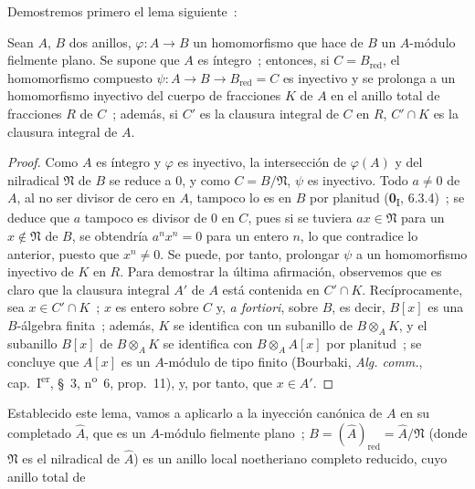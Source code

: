 Demostremos primero el lema siguiente~:

\begin{lemma}[23.2.7.1]
\label{0.23.2.7.1-fr}
Sean $A$, $B$ dos anillos, $\varphi:A\to B$ un homomorfismo que hace de $B$
un $A$-módulo fielmente plano. Se supone que $A$ es íntegro~; entonces, si
$C=B_{\mathrm{red}}$, el homomorfismo compuesto
$\psi:A\to B\to B_{\mathrm{red}}=C$ es inyectivo y se prolonga a un
homomorfismo inyectivo del cuerpo de fracciones $K$ de $A$ en el anillo total
de fracciones $R$ de $C$~; además, si $C'$ es la clausura integral de
$C$ en $R$, $C'\cap K$ es la clausura integral de $A$.
\end{lemma}

\begin{proof}
Como $A$ es íntegro y $\varphi$ es inyectivo, la intersección de $\varphi(A)$
y del nilradical $\mathfrak N$ de $B$ se reduce a $0$, y como
$C=B/\mathfrak N$, $\psi$ es inyectivo. Todo $a\neq0$ de $A$, al no ser
divisor de cero en $A$, tampoco lo es en $B$ por planitud
(\textbf{0}\textsubscript{I}, 6.3.4)~; se deduce que $a$ tampoco es divisor
de $0$ en $C$, pues si se tuviera $ax\in\mathfrak N$ para un
$x\notin\mathfrak N$ de $B$, se obtendría $a^nx^n=0$ para un entero $n$,
lo que contradice lo anterior, puesto que $x^n\neq0$. Se puede, por tanto, prolongar
$\psi$ a un homomorfismo inyectivo de $K$ en $R$. Para demostrar la última
afirmación, observemos que es claro que la clausura integral $A'$ de $A$ está
contenida en $C'\cap K$. Recíprocamente, sea $x\in C'\cap K$~; $x$ es
entero sobre $C$ y, \emph{a fortiori}, sobre $B$, es decir, $B[x]$ es una
$B$-álgebra finita~; además, $K$ se identifica con un subanillo de
$B\otimes_AK$, y el subanillo $B[x]$ de $B\otimes_AK$ se identifica con
$B\otimes_AA[x]$ por planitud~; se concluye que $A[x]$ es un $A$-módulo
de tipo finito (Bourbaki, \emph{Alg. comm.}, cap.~I\textsuperscript{er}, §~3,
n\textsuperscript{o}~6, prop.~11), y, por tanto, que $x\in A'$.
\end{proof}

Establecido este lema, vamos a aplicarlo a la inyección canónica de $A$
en su completado $\widehat A$, que es un $A$-módulo fielmente plano~;
$B=(\widehat A)_{\mathrm{red}}=\widehat A/\mathfrak N$ (donde $\mathfrak N$ es
el nilradical de $\widehat A$) es un anillo local noetheriano completo reducido,
cuyo anillo total de


